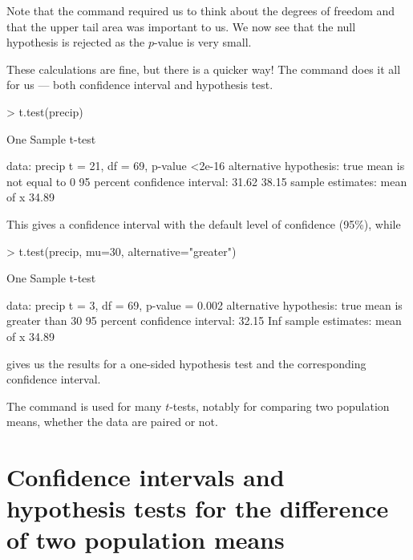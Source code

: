  Note that the  command required us to think about the degrees of freedom and that the upper tail area was important to us. We now see that the null hypothesis is rejected as the $p$-value is very small. 
 
These calculations are fine, but there is a quicker way! The  command does it all for us --- both confidence interval and hypothesis test. 

\begin{Schunk}
\begin{Sinput}
> t.test(precip) 
\end{Sinput}
\begin{Soutput}

	One Sample t-test

data:  precip
t = 21, df = 69, p-value <2e-16
alternative hypothesis: true mean is not equal to 0
95 percent confidence interval:
 31.62 38.15
sample estimates:
mean of x 
    34.89 
\end{Soutput}
\end{Schunk}

This gives a confidence interval with the default level of confidence (95\%), while 

\begin{Schunk}
\begin{Sinput}
> t.test(precip, mu=30, alternative="greater") 
\end{Sinput}
\begin{Soutput}

	One Sample t-test

data:  precip
t = 3, df = 69, p-value = 0.002
alternative hypothesis: true mean is greater than 30
95 percent confidence interval:
 32.15   Inf
sample estimates:
mean of x 
    34.89 
\end{Soutput}
\end{Schunk}

gives us the results for a one-sided hypothesis test and the corresponding confidence interval. 
 
The  command is used for many $t$-tests, notably for comparing two population means, whether the data are paired or not. 
 
\section{Confidence intervals and hypothesis tests for the difference of two population means} 
 
